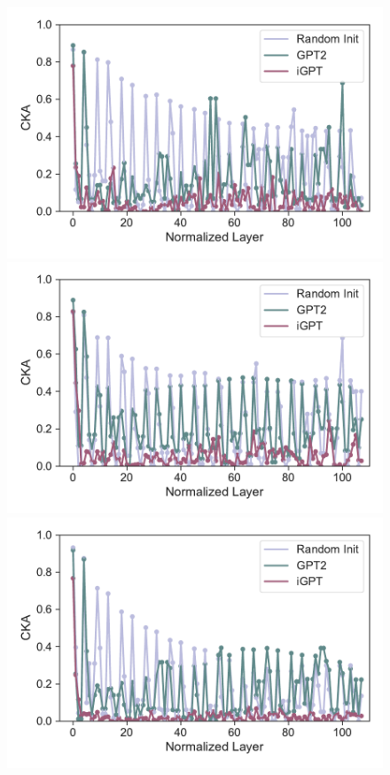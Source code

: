 \documentclass{article}
\begin{document}
\begin{figure}[H]
    \centering
    \begin{minipage}[b]{0.32\linewidth}
        \includegraphics[width=\linewidth]{figs/cka_plot_40_gpt2_igpt_dt_hopper_medium_42_state.pdf}
    \end{minipage}
    \begin{minipage}[b]{0.32\linewidth}
        \includegraphics[width=\linewidth]{figs/cka_plot_40_gpt2_igpt_dt_halfcheetah_medium_42_state.pdf}
    \end{minipage}
    \begin{minipage}[b]{0.32\linewidth}
        \includegraphics[width=\linewidth]{figs/cka_plot_40_gpt2_igpt_dt_walker2d_medium_42_state.pdf}

\end{minipage}
\end{figure}
\end{document}
